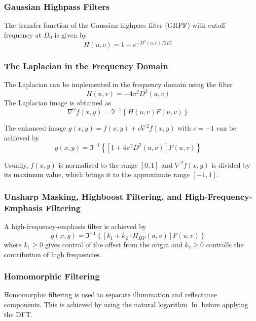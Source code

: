 \subsubsection{Gaussian Highpass Filters}
The transfer function of the Gaussian highpass filter (GHPF) with cutoff frequency at $D_0$ is given by
\begin{equation}
	H(u,v) = 1 - e^{-D^2(u,v)/2D_0^2}
\end{equation}

\subsubsection{The Laplacian in the Frequency Domain }
The Laplacian can be implemented in the frequency domain using the filter
\begin{equation}
	H(u,v) = -4 \pi^2 D^2(u,v)
	\label{equ:Laplacian_Freq_Domain}
\end{equation}
The Laplacian image is obtained as
\begin{equation}
	\nabla^2 f(x,y) = \Im^{-1} \left\lbrace H(u,v)F(u,v) \right\rbrace 
\end{equation}

The enhanced image $g(x,y) = f(x,y) + c \nabla^2f(x,y)$ with $c=-1$ can be achieved by
\begin{equation}
	g(x,y) = \Im^{-1} \left\lbrace \left[ 1 + 4 \pi^2 D^2(u,v) \right] F(u,v) \right\rbrace 
\end{equation}

Usually, $f(x,y)$ is normalized to the range $\left[0,1\right]$ and $\nabla^2 f(x,y)$ is divided by its maximum value, which brings it to the approximate range $\left[-1,1\right]$.

\subsubsection{Unsharp Masking, Highboost Filtering, and High-Frequency-Emphasis Filtering }
A high-frequency-emphasis filter is achieved by
\begin{equation}
	g(x,y) = \Im^{-1} \left\lbrace \left[ k_1 + k_2 \cdot H_{HP}(u,v) \right] F(u,v) \right\rbrace 
\end{equation}
where $k_1 \geq 0$ gives control of the offset from the origin and $k_2 \geq 0$ controlls the contribution of high frequencies.

\subsubsection{Homomorphic Filtering }
\begin{minipage}{9cm}
	Homomorphic filtering is used to separate illumination and reflectance components. This is achieved by using the natural logarithm $\ln$ before applying the DFT.
\end{minipage}
\begin{minipage}{9cm}
\end{minipage} \\

